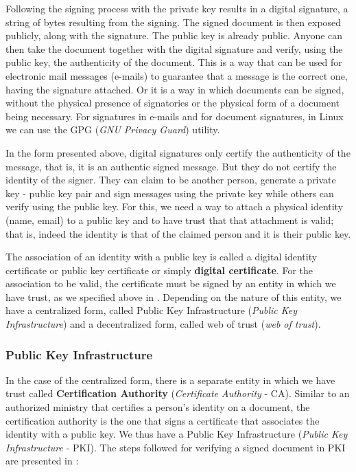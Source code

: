 Following the signing process with the private key results in a digital signature, a string of bytes resulting from the signing.
The signed document is then exposed publicly, along with the signature.
The public key is already public.
Anyone can then take the document together with the digital signature and verify, using the public key, the authenticity of the document.
This is a way that can be used for electronic mail messages (e-mails) to guarantee that a message is the correct one, having the signature attached.
Or it is a way in which documents can be signed, without the physical presence of signatories or the physical form of a document being necessary.
For signatures in e-mails and for document signatures, in Linux we can use the GPG  (\textit{GNU Privacy Guard}) utility.

In the form presented above, digital signatures only certify the authenticity of the message, that is, it is an authentic signed message.
But they do not certify the identity of the signer.
They can claim to be another person, generate a private key - public key pair and sign messages using the private key while others can verify using the public key.
For this, we need a way to attach a physical identity (name, email) to a public key and to have trust that that attachment is valid;
that is, indeed the identity is that of the claimed person and it is their public key.

The association of an identity with a public key is called a digital identity certificate or public key certificate or simply \textbf{digital certificate}.
For the association to be valid, the certificate must be signed by an entity in which we have trust, as we specified above in .
Depending on the nature of this entity, we have a centralized form, called Public Key Infrastructure (\textit{Public Key Infrastructure}) and a decentralized form, called web of trust (\textit{web of trust}).

\subsubsection{Public Key Infrastructure}
\label{sec:sec:transfer:sign:pki}

In the case of the centralized form, there is a separate entity in which we have trust called \textbf{Certification Authority} (\textit{Certificate Authority} - CA).
Similar to an authorized ministry that certifies a person's identity on a document, the certification authority is the one that signs a certificate that associates the identity with a public key.
We thus have a Public Key Infrastructure (\textit{Public Key Infrastructure} - PKI).
The steps followed for verifying a signed document in PKI are presented in :

